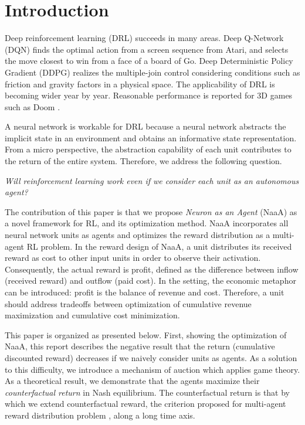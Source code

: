 \section{Introduction}
Deep reinforcement learning (DRL) succeeds in many areas.
Deep Q-Network (DQN) \citep{mnih2015human,silver2016mastering} finds the optimal action from a screen sequence from Atari, and selects the move closest to win from a face of a board of Go.
Deep Deterministic Policy Gradient (DDPG) \citep{lillicrap2015continuous} realizes the multiple-join control considering conditions such as friction and gravity factors in a physical space.
The applicability of DRL is becoming wider year by year. Reasonable performance is reported for 3D games such as Doom \citep{dosovitskiy2016learning}.

A neural network is workable for DRL because a neural network abstracts the implicit state in an environment and obtains an informative state representation.
From a micro perspective, the abstraction capability of each unit contributes to the return of the entire system.
Therefore, we address the following question.

\begin{center}
{\em Will reinforcement learning work even if we consider each unit as an autonomous agent?}
\end{center}

The contribution of this paper is that we propose {\em Neuron as an Agent} (NaaA) as a novel framework for RL, and its optimization method.
NaaA incorporates all neural network units as agents and optimizes the reward distribution as a multi-agent RL problem.
In the reward design of NaaA, a unit distributes its received reward as cost to other input units in order to observe their activation.
Consequently, the actual reward is profit, defined as the difference between inflow (received reward) and outflow (paid cost).
In the setting, the economic metaphor can be introduced: profit is the balance of revenue and cost. 
Therefore, a unit should address tradeoffs between optimization of cumulative revenue maximization and cumulative cost minimization.

This paper is organized as presented below.
First, showing the optimization of NaaA, this report describes the negative result that the return (cumulative discounted reward) decreases if we naively consider units as agents.
As a solution to this difficulty, we introduce a mechanism of auction which applies game theory.
As a theoretical result, we demonstrate that the agents maximize their {\em counterfactual return} in Nash equilibrium.
The counterfactual return is that by which we extend counterfactual reward, the criterion proposed for multi-agent reward distribution problem \citep{agogino2006quicr}, along a long time axis.

